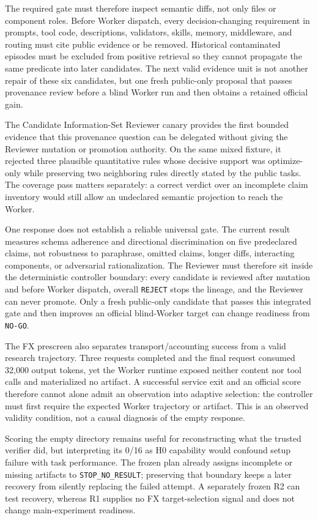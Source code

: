 The required gate must therefore inspect semantic diffs, not only files or
component roles. Before Worker dispatch, every decision-changing requirement
in prompts, tool code, descriptions, validators, skills, memory, middleware,
and routing must cite public evidence or be removed. Historical contaminated
episodes must be excluded from positive retrieval so they cannot propagate the
same predicate into later candidates. The next valid evidence unit is not
another repair of these six candidates, but one fresh public-only proposal that
passes provenance review before a blind Worker run and then obtains a retained
official gain.

The Candidate Information-Set Reviewer canary provides the first bounded
evidence that this provenance question can be delegated without giving the
Reviewer mutation or promotion authority. On the same mixed fixture, it
rejected three plausible quantitative rules whose decisive support was
optimize-only while preserving two neighboring rules directly stated by the
public tasks. The coverage pass matters separately: a correct verdict over an
incomplete claim inventory would still allow an undeclared semantic projection
to reach the Worker.

One response does not establish a reliable universal gate. The current result
measures schema adherence and directional discrimination on five predeclared
claims, not robustness to paraphrase, omitted claims, longer diffs, interacting
components, or adversarial rationalization. The Reviewer must therefore sit
inside the deterministic controller boundary: every candidate is reviewed
after mutation and before Worker dispatch, overall \texttt{REJECT} stops the
lineage, and the Reviewer can never promote. Only a fresh public-only candidate
that passes this integrated gate and then improves an official blind-Worker
target can change readiness from \texttt{NO-GO}.

The FX prescreen also separates transport/accounting success from a valid
research trajectory. Three requests completed and the final request consumed
32,000 output tokens, yet the Worker runtime exposed neither content nor tool
calls and materialized no artifact. A successful service exit and an official
score therefore cannot alone admit an observation into adaptive selection:
the controller must first require the expected Worker trajectory or artifact.
This is an observed validity condition, not a causal diagnosis of the empty
response.

Scoring the empty directory remains useful for reconstructing what the trusted
verifier did, but interpreting its 0/16 as H0 capability would confound setup
failure with task performance. The frozen plan already assigns incomplete or
missing artifacts to \texttt{STOP\_NO\_RESULT}; preserving that boundary keeps
a later recovery from silently replacing the failed attempt. A separately
frozen R2 can test recovery, whereas R1 supplies no FX target-selection signal
and does not change main-experiment readiness.

